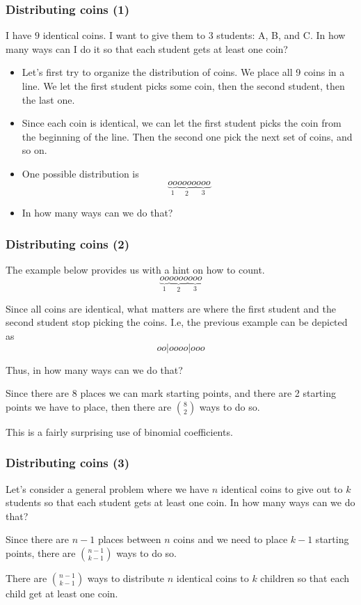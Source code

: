 \begin{frame}\frametitle{Distributing coins (1)}
  \begin{tcolorbox}
    I have $9$ identical coins.  I want to give them to $3$ students:
    A, B, and C.  In how many ways can I do it so that each student
    gets at least one coin?
  \end{tcolorbox}

  \begin{itemize}
  \item Let's first try to organize the distribution of coins.  \pause
    We place all 9 coins in a line.  We let the first student picks
    some coin, then the second student, then the last one. \pause
  \item Since each coin is identical, we can let the first student
    picks the coin from the beginning of the line.  Then the second
    one pick the next set of coins, and so on. \pause
  \item One possible distribution is
    \[
    \underbrace{o o}_{1} \underbrace{o o o o}_{2} \underbrace{o o o}_{3}
    \]
    \pause
  \item In how many ways can we do that?
  \end{itemize}
\end{frame}

\begin{frame}\frametitle{Distributing coins (2)}
  The example below provides us with a hint on how to count.
  \[
  \underbrace{o o}_{1} \underbrace{o o o o}_{2} \underbrace{o o o}_{3}
  \]
  \pause

  Since all coins are identical, what matters are where the first
  student and the second student stop picking the coins. \pause
  I.e, the previous example can be depicted as
  \[
  o o | o o o o | o o o
  \]

  Thus, in how many ways can we do that? \pause
  
  Since there are 8 places we can mark starting points, and
  there are 2 starting points we have to place, then there are
  $\binom{8}{2}$ ways to do so. \pause

  This is a fairly surprising use of binomial coefficients.
\end{frame}

\begin{frame}\frametitle{Distributing coins (3)}
  Let's consider a general problem where we have $n$ identical coins
  to give out to $k$ students so that each student gets at least one
  coin.  In how many ways can we do that?

  \pause Since there are $n-1$ places between $n$ coins and we need to
  place $k-1$ starting points, there are $\binom{n-1}{k-1}$ ways to do
  so.

  \pause
  \begin{tcolorbox}
    There are $\binom{n-1}{k-1}$ ways to distribute $n$ identical
    coins to $k$ children so that each child get at least one coin.
  \end{tcolorbox}
\end{frame}

